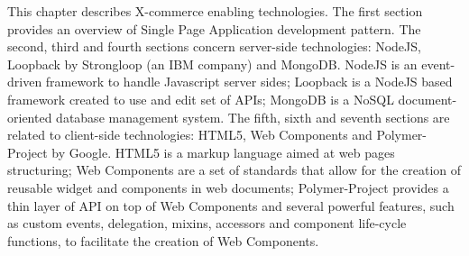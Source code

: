 This chapter describes X-commerce enabling technologies.
The first section provides an overview of Single Page Application development pattern.
The second, third and fourth sections concern server-side technologies: NodeJS, Loopback by Strongloop (an IBM company) and MongoDB. NodeJS is an event-driven framework to handle Javascript server sides; Loopback is a NodeJS based framework created to use and edit set of APIs; MongoDB is a NoSQL document-oriented database management system.
The fifth, sixth and seventh sections are related to client-side technologies: HTML5, Web Components and Polymer-Project by Google. HTML5 is a markup language aimed at web pages structuring; Web Components are a set of standards that allow for the creation of reusable widget and components in  web  documents;  Polymer-Project provides a thin layer of API on top of Web Components and several powerful features, such as custom events, delegation, mixins, accessors and component life-cycle functions, to facilitate the creation of Web  Components.